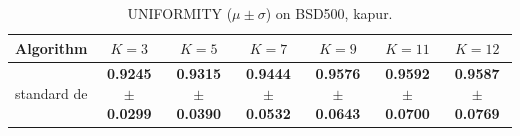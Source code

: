 \begin{table}[htbp]
\centering
\caption{UNIFORMITY ($\mu \pm \sigma$) on BSD500, kapur.}
\label{tab:exp1-kapur-uniformity}
\begin{tabular}{lcccccc}
\toprule
Algorithm & $K=3$ & $K=5$ & $K=7$ & $K=9$ & $K=11$ & $K=12$ \\
\midrule
standard de & \textbf{0.9245 $\pm$ 0.0299} & \textbf{0.9315 $\pm$ 0.0390} & \textbf{0.9444 $\pm$ 0.0532} & \textbf{0.9576 $\pm$ 0.0643} & \textbf{0.9592 $\pm$ 0.0700} & \textbf{0.9587 $\pm$ 0.0769} \\
\bottomrule
\end{tabular}
\end{table}